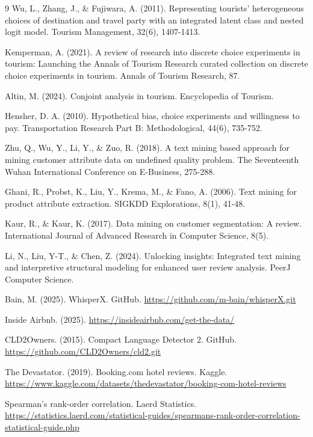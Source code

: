 \documentclass[a4paper, 12pt, twoside]{report}  %
\begin{document}
\begin{thebibliography}{9}
Wu, L., Zhang, J., \& Fujiwara, A. (2011). Representing tourists’ heterogeneous choices of destination and travel party with an integrated latent class and nested logit model. Tourism Management, 32(6), 1407-1413.

Kemperman, A. (2021). A review of research into discrete choice experiments in tourism: Launching the Annals of Tourism Research curated collection on discrete choice experiments in tourism. Annals of Tourism Research, 87.

Altin, M. (2024). Conjoint analysis in tourism. Encyclopedia of Tourism.

Hensher, D. A. (2010). Hypothetical bias, choice experiments and willingness to pay. Transportation Research Part B: Methodological, 44(6), 735-752.

Zhu, Q., Wu, Y., Li, Y., \& Zuo, R. (2018). A text mining based approach for mining customer attribute data on undefined quality problem. The Seventeenth Wuhan International Conference on E-Business, 275-288.

Ghani, R., Probst, K., Liu, Y., Krema, M., \& Fano, A. (2006). Text mining for product attribute extraction. SIGKDD Explorations, 8(1), 41-48.

Kaur, R., \& Kaur, K. (2017). Data mining on customer segmentation: A review. International Journal of Advanced Research in Computer Science, 8(5).

Li, N., Liu, Y-T., \& Chen, Z. (2024). Unlocking insights: Integrated text mining and interpretive structural modeling for enhanced user review analysis. PeerJ Computer Science.

Bain, M. (2025). WhisperX. GitHub. \url{https://github.com/m-bain/whisperX.git}

Inside Airbnb. (2025). \url{https://insideairbnb.com/get-the-data/}

CLD2Owners. (2015). Compact Language Detector 2. GitHub. \url{https://github.com/CLD2Owners/cld2.git}

The Devastator. (2019). Booking.com hotel reviews. Kaggle. \url{https://www.kaggle.com/datasets/thedevastator/booking-com-hotel-reviews}

Spearman's rank-order correlation. Laerd Statistics. \url{https://statistics.laerd.com/statistical-guides/spearmans-rank-order-correlation-statistical-guide.php}


\end{thebibliography}
\end{document}
